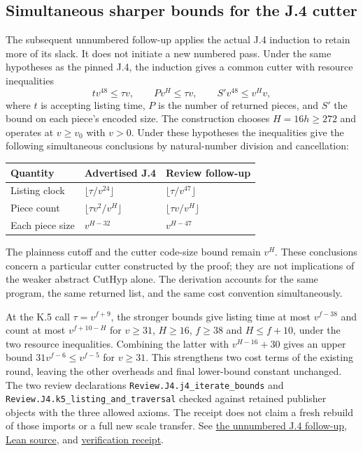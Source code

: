 \documentclass[11pt,letterpaper]{article}
\theoremstyle{definition}\newtheorem{definition}[theorem]{Definition}\newtheorem{example}[theorem]{Example}
\theoremstyle{remark}\newtheorem{remark}[theorem]{Remark}
\newcommand{\follow}[2]{\href{https://github.com/nousentllc/VP-VNP-Review/blob/8a7976933b6b2b4ffda1ad3a0dfb5fc6b6f023e8/#1}{#2}}
\begin{document}
\subsection{Simultaneous sharper bounds for the J.4 cutter}\label{sec:j4tight}
The subsequent unnumbered follow-up applies the actual J.4 induction to retain more of its slack. It does not initiate a new numbered pass. Under the same hypotheses as the pinned J.4, the induction gives a common cutter with resource inequalities
\[
 t v^{48}\le \tau v,\qquad Pv^H\le\tau v,\qquad S'v^{48}\le v^H v,
\]
where $t$ is accepting listing time, $P$ is the number of returned pieces, and $S'$ the bound on each piece's encoded size. The construction chooses $H=16h\ge272$ and operates at $v\ge v_0$ with $v>0$. Under these hypotheses the inequalities give the following simultaneous conclusions by natural-number division and cancellation:
\begin{center}
\begin{tabular}{@{}lll@{}}\toprule
Quantity & Advertised J.4 & Review follow-up \\\midrule
Listing clock & $\lfloor\tau/v^{24}\rfloor$ & $\lfloor\tau/v^{47}\rfloor$\\
Piece count & $\lfloor\tau v^2/v^H\rfloor$ & $\lfloor\tau v/v^H\rfloor$\\
Each piece size & $v^{H-32}$ & $v^{H-47}$\\
\bottomrule\end{tabular}
\end{center}
The plainness cutoff and the cutter code-size bound remain $v^H$. These conclusions concern a particular cutter constructed by the proof; they are not implications of the weaker abstract CutHyp alone. The derivation accounts for the same program, the same returned list, and the same cost convention simultaneously.

At the K.5 call $\tau=v^{f+9}$, the stronger bounds give listing time at most $v^{f-38}$ and count at most $v^{f+10-H}$ for $v\ge31$, $H\ge16$, $f\ge38$ and $H\le f+10$, under the two resource inequalities. Combining the latter with $v^{H-16}+30$ gives an upper bound $31v^{f-6}\le v^{f-5}$ for $v\ge31$. This strengthens two cost terms of the existing round, leaving the other overheads and final lower-bound constant unchanged. The two review declarations \texttt{Review.J4.j4\_iterate\_bounds} and \texttt{Review.J4.k5\_listing\_and\_traversal} checked against retained publisher objects with the three allowed axioms. The receipt does not claim a fresh rebuild of those imports or a full new scale transfer. See \follow{followups/j4/README.md}{the unnumbered J.4 follow-up}, \follow{followups/j4/J4_Followup.lean}{Lean source}, and \follow{followups/j4/verification.json}{verification receipt}.
\end{document}
